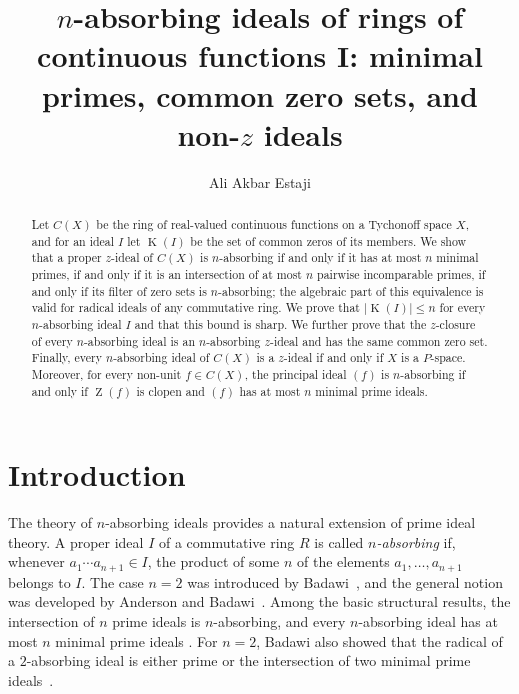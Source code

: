 \documentclass[11pt]{amsart}
\title[$n$-absorbing ideals of $C(X)$: minimal primes and common zero sets]
{$n$-absorbing ideals of rings of continuous functions I:
minimal primes, common zero sets, and non-$z$ ideals}
\author{Ali Akbar Estaji}
\date{}
\theoremstyle{definition}
\theoremstyle{remark}
\DeclareMathOperator{\Z}{Z}
\DeclareMathOperator{\K}{K}
\begin{document}
\begin{abstract}
Let $C(X)$ be the ring of real-valued continuous functions on a
Tychonoff space $X$, and for an ideal $I$ let $\K(I)$ be the set of
common zeros of its members.
We show that a proper $z$-ideal of $C(X)$ is $n$-absorbing if and only
if it has at most $n$ minimal primes, if and only if it is an
intersection of at most $n$ pairwise incomparable primes, if and only if
its filter of zero sets is $n$-absorbing; the algebraic part of this
equivalence is valid for radical ideals of any commutative ring.
We prove that $|\K(I)|\le n$ for every $n$-absorbing ideal $I$ and that
this bound is sharp.
We further prove that the $z$-closure of every $n$-absorbing ideal
is an $n$-absorbing $z$-ideal and has the same common zero set.
Finally, every $n$-absorbing ideal of $C(X)$ is a $z$-ideal if and
only if $X$ is a $P$-space. Moreover, for every non-unit
$f\in C(X)$, the principal ideal $(f)$ is $n$-absorbing if and only
if $\Z(f)$ is clopen and $(f)$ has at most $n$ minimal prime ideals.
\end{abstract}

\maketitle

\section{Introduction}

The theory of $n$-absorbing ideals provides a natural extension of prime
ideal theory. A proper ideal $I$ of a commutative ring $R$ is called
\emph{$n$-absorbing} if, whenever
$a_1\cdots a_{n+1}\in I$, the product of some $n$ of the elements
$a_1,\ldots,a_{n+1}$ belongs to $I$. The case $n=2$ was introduced by
Badawi~\cite{Badawi}, and the general notion was developed by Anderson
and Badawi~\cite{AndersonBadawi}. Among the basic structural results,
the intersection of $n$ prime ideals is $n$-absorbing, and every
$n$-absorbing ideal has at most $n$ minimal prime ideals
\cite[Theorems~2.1(c) and~2.5]{AndersonBadawi}. For $n=2$, Badawi also
showed that the radical of a $2$-absorbing ideal is either prime or the
intersection of two minimal prime ideals~\cite{Badawi}.
\end{document}

